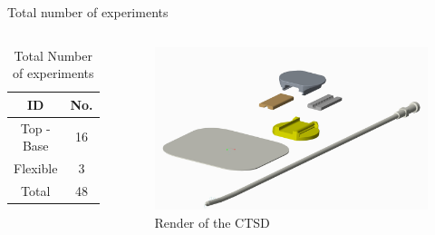 \documentclass[10pt]{beamer} %
\begin{document}
\begin{frame}[fragile]{Total number of experiments}
\vspace{1cm}
\begin{columns}[T,onlytextwidth]
\begin{table}
\begin{centering}
\begin{tabular}{|c|c|}
\hline 
ID & No.\tabularnewline
\hline 
\hline 
Top - Base & 16\tabularnewline
\hline 
Flexible & 3\tabularnewline
\hline 
Total & 48\tabularnewline
\hline 
\end{tabular}
\par\end{centering}
\caption{Total Number of experiments}
\end{table}
\begin{figure}
\includegraphics[scale=0.025]{chesttube}
\caption{Render of the CTSD}
\end{figure}
\end{columns}
\end{frame}
\end{document}
